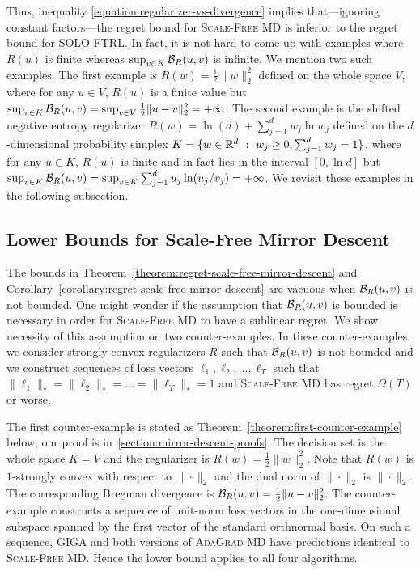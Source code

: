 Thus, inequality \eqref{equation:regularizer-vs-divergence} implies
that---ignoring constant factors---the regret bound for \textsc{Scale-Free MD}
is inferior to the regret bound for \textsc{SOLO FTRL}.
In fact, it is not hard to come up with examples where $R(u)$ is finite whereas
$\sup_{v \in K} \mathcal{B}_R(u,v)$ is infinite. We mention two such examples. The
first example is $R(w) = \frac{1}{2}\|w\|_2^2$ defined on the whole space $V$,
where for any $u \in V$, $R(u)$ is a finite value but $\sup_{v \in K}
\mathcal{B}_R(u,v) = \sup_{v \in V} \frac{1}{2}\|u-v\|_2^2 = +\infty$. The second
example is the shifted negative entropy regularizer $R(w) = \ln(d) +
\sum_{j=1}^d w_j \ln w_j$ defined on the $d$-dimensional probability simplex $K
= \{ w \in \mathbb{R}^d ~:~ w_j \ge 0, \sum_{j=1}^d w_j = 1 \}$, where for any $u \in
K$, $R(u)$ is finite and in fact lies in the interval $[0, \ln d]$ but
$\sup_{v \in K} \mathcal{B}_R(u,v) = \sup_{v \in K} \sum_{j=1}^d u_j \ln(u_j/v_j) = +
\infty$. We revisit these examples in the following subsection.

\subsection{Lower Bounds for Scale-Free Mirror Descent}
\label{subsection:mirror-descent-lower-bound}

The bounds in Theorem~\ref{theorem:regret-scale-free-mirror-descent} and
Corollary~\ref{corollary:regret-scale-free-mirror-descent} are vacuous when
$\mathcal{B}_R(u,v)$ is not bounded. One might wonder if the assumption that
$\mathcal{B}_R(u,v)$ is bounded is necessary in order for \textsc{Scale-Free MD} to
have a sublinear regret. We show necessity of this assumption on two
counter-examples.  In these counter-examples, we consider strongly convex
regularizers $R$ such that $\mathcal{B}_R(u,v)$ is not bounded and we construct
sequences of loss vectors $\ell_1, \ell_2, \dots, \ell_T$ such that
$\|\ell_1\|_* = \|\ell_2\|_* = \dots = \|\ell_T\|_* = 1$ and \textsc{Scale-Free
MD} has regret $\Omega(T)$ or worse.

The first counter-example is stated as
Theorem~\ref{theorem:first-counter-example} below; our proof is
in~\ref{section:mirror-descent-proofs}. The decision set is the whole space
$K=V$ and the regularizer is $R(w) = \frac{1}{2}\|w\|_2^2$. Note that $R(w)$ is
$1$-strongly convex with respect to $\|\cdot\|_2$ and the dual norm of
$\|\cdot\|_2$ is $\|\cdot\|_2$. The corresponding Bregman divergence is
$\mathcal{B}_R(u,v) = \frac{1}{2}\|u-v\|_2^2$. The counter-example constructs a
sequence of unit-norm loss vectors in the one-dimensional subspace spanned by
the first vector of the standard orthnormal basis.  On such a sequence,
\textsc{GIGA} and both versions of \textsc{AdaGrad MD} have predictions
identical to \textsc{Scale-Free MD}. Hence the lower bound applies to all four
algorithms.

